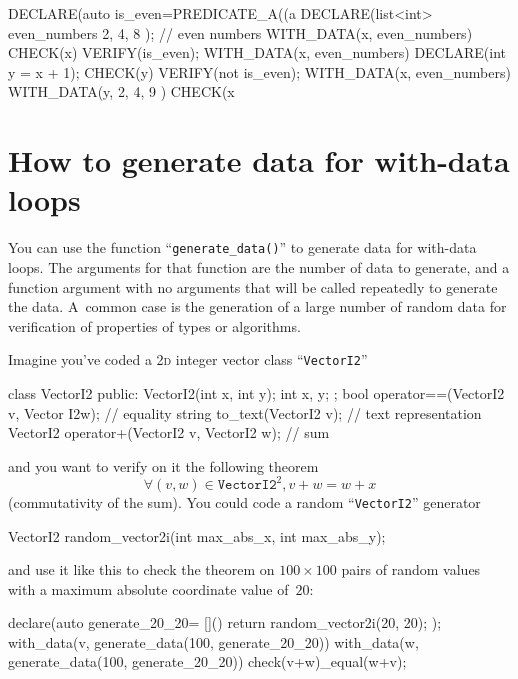 \documentclass[twoside, a4paper, article]{memoir}
\begin{document}
\begin{cpplisting}
DECLARE(auto is_even=PREDICATE_A((a %
DECLARE(list<int> even_numbers{ 2, 4, 8 }); // even numbers
WITH_DATA(x, even_numbers)
  CHECK(x) VERIFY(is_even);
WITH_DATA(x, even_numbers)
{
  DECLARE(int y = x + 1);
  CHECK(y) VERIFY(not is_even);
}
WITH_DATA(x, even_numbers)
  WITH_DATA(y, { 2, 4, 9 })
    CHECK(x %
\end{cpplisting}

\section{How to generate data for with-data loops}
\label{sec:generate-data-with-data-loops}

You can use the function ``\texttt{generate\_data()}'' to generate data for
with-data loops.  The arguments for that function are the number of data to
generate, and a function argument with no arguments that will be called
repeatedly to generate the data.  A~common case is the generation of a large
number of random data for verification of properties of types or algorithms.

Imagine you've coded a \textsc{2d} integer vector class ``\texttt{VectorI2}''
\begin{cpplisting}
class VectorI2 {
public:
  VectorI2(int x, int y);
  int x, y;
};
bool operator==(VectorI2 v, Vector I2w); // equality
string to_text(VectorI2 v); // text representation
VectorI2 operator+(VectorI2 v, VectorI2 w); // sum
\end{cpplisting}
and you want to verify on it the following theorem
\begin{equation}
  \label{eq:1}
  \forall (v, w) \in \texttt{VectorI2}^2, v + w = w + x
\end{equation}
(commutativity of the sum).  You could code a random ``\texttt{VectorI2}''
generator
\begin{cpplisting}
VectorI2 random_vector2i(int max_abs_x, int max_abs_y);
\end{cpplisting}
and use it like this to check the theorem on $100 \times 100$ pairs of random
values with a maximum absolute coordinate value of~$20$:
\begin{cpplisting}
declare(auto generate_20_20=
        []() { return random_vector2i(20, 20); });
with_data(v, generate_data(100, generate_20_20))
  with_data(w, generate_data(100, generate_20_20))
    check(v+w)_equal(w+v);
\end{cpplisting}
\end{document}
